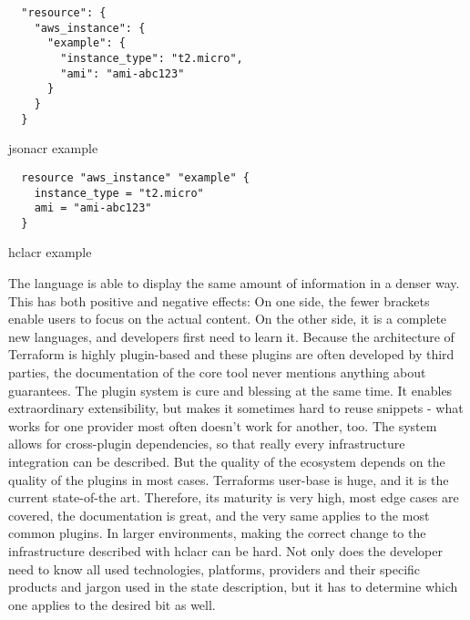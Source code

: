 \begin{listing}[H]\begin{addmargin}[2em]{2em}\begin{verbatim}
  "resource": {
    "aws_instance": {
      "example": {
        "instance_type": "t2.micro",
        "ami": "ami-abc123"
      }
    }
  }
  \end{verbatim}
  \caption{\gls{jsonacr} example}
  \label{code:json_example}
  \end{addmargin}
\end{listing}

\begin{listing}[H]\begin{addmargin}[2em]{2em}\begin{verbatim}
  resource "aws_instance" "example" {
    instance_type = "t2.micro"
    ami = "ami-abc123"
  }
  \end{verbatim}
  \caption{\gls{hclacr} example}
  \label{code:hcl_example}
  \end{addmargin}
\end{listing}

The language is able to display the same amount of information in a denser way. This has both positive and negative effects: On one side, the fewer brackets enable users to focus on the actual content. On the other side, it is a complete new languages, and developers first need to learn it.
\newline
Because the architecture of Terraform is highly plugin-based and these plugins are often developed by third parties, the documentation of the core tool never mentions anything about guarantees.
\newline
The plugin system is cure and blessing at the same time. It enables extraordinary extensibility, but makes it sometimes hard to reuse snippets - what works for one provider most often doesn't work for another, too. The system allows for cross-plugin dependencies, so that really every infrastructure integration can be described. But the quality of the ecosystem depends on the quality of the plugins in most cases. Terraforms user-base is huge, and it is the current state-of-the art. %
Therefore, its maturity is very high, most edge cases are covered, the documentation is great, and the very same applies to the most common plugins.
\newline
In larger environments, making the correct change to the infrastructure described with \gls{hclacr} can be hard. Not only does the developer need to know all used technologies, platforms, providers and their specific products and jargon used in the state description, but it has to determine which one applies to the desired bit as well.

